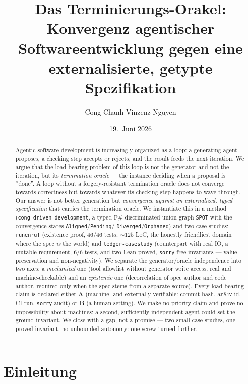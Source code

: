 \documentclass[11pt,a4paper]{article}
\title{Das Terminierungs-Orakel: Konvergenz agentischer
Softwareentwicklung gegen eine externalisierte, getypte Spezifikation}
\author{Cong Chanh Vinzenz Nguyen}
\date{19.\ Juni 2026}
\theoremstyle{definition}
\theoremstyle{remark}
\begin{document}
\maketitle

\begin{abstract}
\noindent
Agentic software development is increasingly organized as a loop: a generating
agent proposes, a checking step accepts or rejects, and the result feeds the next
iteration. We argue that the load-bearing problem of this loop is not the
generator and not the iteration, but its \emph{termination oracle} --- the
instance deciding when a proposal is \enquote{done}. A loop without a
forgery-resistant termination oracle does not converge towards correctness but
towards whatever its checking step happens to wave through. Our answer is not
better generation but \emph{convergence against an externalized, typed
specification} that carries the termination oracle. We instantiate this in a
method (\texttt{cong-driven-development}, a typed F\# discriminated-union graph
\texttt{SPOT} with the convergence states \texttt{Aligned}/\texttt{Pending}/%
\texttt{Diverged}/\texttt{Orphaned}) and two case studies: \texttt{runenruf}
(existence proof, $46/46$ tests, $\sim\!125$ LoC, the honestly friendliest domain
where the spec \emph{is} the world) and \texttt{ledger-casestudy} (counterpart
with real IO, a mutable requirement, $6/6$ tests, and two Lean-proved,
\texttt{sorry}-free invariants --- value preservation and non-negativity). We separate the
generator/oracle independence into two axes: a \emph{mechanical} one (tool
allowlist without generator write access, real and machine-checkable) and an
\emph{epistemic} one (decorrelation of spec author and code author, required only
when the spec stems from a separate source). Every load-bearing claim is declared
either \textbf{A} (machine- and externally verifiable: commit hash, arXiv id, CI
run, \texttt{sorry} audit) or \textbf{B} (a human setting). We make no priority
claim and prove no impossibility about machines: a second, sufficiently
independent agent could set the ground invariant. We close with a gap, not a
promise --- two small case studies, one proved invariant, no unbounded autonomy:
one screw turned further.
\end{abstract}

\tableofcontents
\bigskip

\section{Einleitung}
\label{sec:einleitung}
\end{document}
